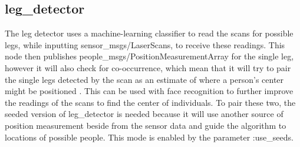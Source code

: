 \subsection{leg\_detector} %

The leg detector uses a machine-learning classifier to read the scans for possible legs, while inputting sensor\_msgs/LaserScans, to receive these readings. This node then publishes people\_msgs/PositionMeasurementArray for the single leg, however it will also check for co-occurrence, which mean that it will try to pair the single legs detected by the scan as an estimate of where a person's center might be positioned \cite{legdetect}. This can be used with face recognition to further improve the readings of the scans to find the center of individuals. To pair these two, the seeded version of leg\_detector is needed because it will use another source of position measurement beside from the sensor data and guide the algorithm to locations of possible people. This mode is enabled by the parameter :use\_seeds.